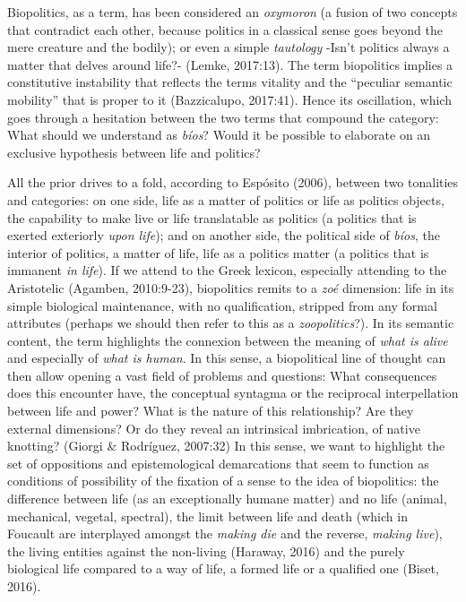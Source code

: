 \documentclass[a4paper,]{scrartcl}
\begin{document}
Biopolitics, as a term, has been considered an \emph{oxymoron} (a fusion
of two concepts that contradict each other, because politics in a
classical sense goes beyond the mere creature and the bodily); or even a
simple \emph{tautology} -Isn't politics always a matter that delves
around life?- (Lemke, 2017:13). The term biopolitics implies a
constitutive instability that reflects the terms vitality and the
``peculiar semantic mobility'' that is proper to it (Bazzicalupo,
2017:41). Hence its oscillation, which goes through a hesitation between
the two terms that compound the category: What should we understand as
\emph{bíos}? Would it be possible to elaborate on an exclusive
hypothesis between life and politics?

All the prior drives to a fold, according to Espósito (2006), between
two tonalities and categories: on one side, life as a matter of politics
or life as politics objects, the capability to make live or life
translatable as politics (a politics that is exerted exteriorly
\emph{upon life}); and on another side, the political side of
\emph{bíos}, the interior of politics, a matter of life, life as a
politics matter (a politics that is immanent \emph{in life}). If we
attend to the Greek lexicon, especially attending to the Aristotelic
(Agamben, 2010:9-23), biopolitics remits to a \emph{zoé} dimension: life
in its simple biological maintenance, with no qualification, stripped
from any formal attributes (perhaps we should then refer to this as a
\emph{zoopolitics}?). In its semantic content, the term highlights the
connexion between the meaning of \emph{what is alive} and especially of
\emph{what is human}. In this sense, a biopolitical line of thought can
then allow opening a vast field of problems and questions: What
consequences does this encounter have, the conceptual syntagma or the
reciprocal interpellation between life and power? What is the nature of
this relationship? Are they external dimensions? Or do they reveal an
intrinsical imbrication, of native knotting? (Giorgi \& Rodríguez,
2007:32) In this sense, we want to highlight the set of oppositions and
epistemological demarcations that seem to function as conditions of
possibility of the fixation of a sense to the idea of biopolitics: the
difference between life (as an exceptionally humane matter) and no life
(animal, mechanical, vegetal, spectral), the limit between life and
death (which in Foucault are interplayed amongst the \emph{making die}
and the reverse, \emph{making live}), the living entities against the
non-living (Haraway, 2016) and the purely biological life compared to a
way of life, a formed life or a qualified one (Biset, 2016).
\end{document}
